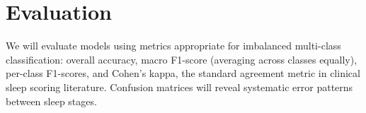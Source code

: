 \documentclass[final]{article}
\begin{document}
\section{Evaluation}

We will evaluate models using metrics appropriate for imbalanced multi-class classification: overall accuracy, macro F1-score (averaging across classes equally), per-class F1-scores, and Cohen's kappa, the standard agreement metric in clinical sleep scoring literature. Confusion matrices will reveal systematic error patterns between sleep stages.




\end{document}
